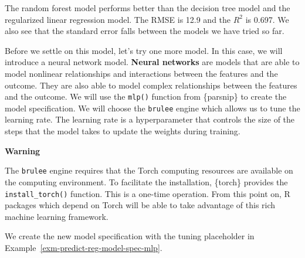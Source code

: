 \documentclass[
  letterpaper,
  krantz1]{latex/krantz-mod}
\theoremstyle{definition}
\theoremstyle{definition}
\theoremstyle{remark}
\begin{document}
The random forest model performs better than the decision tree model and
the regularized linear regression model. The RMSE is 12.9 and the
\(R^2\) is 0.697. We also see that the standard error falls between the
models we have tried so far.

Before we settle on this model, let's try one more model. In this case,
we will introduce a neural network model. \textbf{Neural
networks} are models that are able to model
nonlinear relationships and interactions between the features and the
outcome. They are also able to model complex relationships between the
features and the outcome. We will use the \texttt{mlp()} function from
\{parsnip\} to create the model specification. We will choose the
\texttt{brulee} engine which allows us to tune the learning rate. The
learning rate is a hyperparameter that controls the size of the steps
that the model takes to update the weights during training.

\begin{tcolorbox}[enhanced jigsaw, toprule=.15mm, breakable, colback=white, arc=.35mm, left=2mm, colframe=quarto-callout-color-frame, opacityback=0, bottomrule=.15mm, rightrule=.15mm, leftrule=.75mm]

\textbf{ Warning}

The \texttt{brulee} engine requires that the Torch computing resources
are available on the computing environment. To facilitate the
installation, \{torch\} provides the \texttt{install\_torch()} function.
This is a one-time operation. From this point on, R packages which
depend on Torch will be able to take advantage of this rich machine
learning framework.

\end{tcolorbox}

We create the new model specification with the tuning placeholder in
Example~\ref{exm-predict-reg-model-spec-mlp}.
\end{document}
